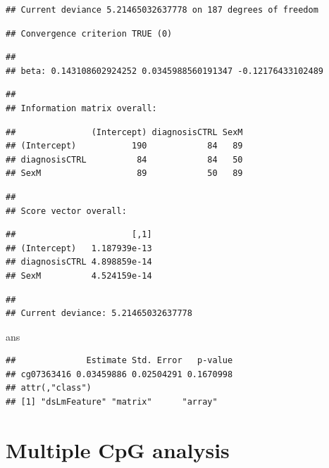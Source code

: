 \documentclass[
]{book}
\newenvironment{Shaded}{\begin{snugshade}}{\end{snugshade}}
\newcommand{\NormalTok}[1]{#1}
\begin{document}
\begin{verbatim}
## Current deviance 5.21465032637778 on 187 degrees of freedom
\end{verbatim}

\begin{verbatim}
## Convergence criterion TRUE (0)
\end{verbatim}

\begin{verbatim}
## 
## beta: 0.143108602924252 0.0345988560191347 -0.12176433102489
\end{verbatim}

\begin{verbatim}
## 
## Information matrix overall:
\end{verbatim}

\begin{verbatim}
##               (Intercept) diagnosisCTRL SexM
## (Intercept)           190            84   89
## diagnosisCTRL          84            84   50
## SexM                   89            50   89
\end{verbatim}

\begin{verbatim}
## 
## Score vector overall:
\end{verbatim}

\begin{verbatim}
##                       [,1]
## (Intercept)   1.187939e-13
## diagnosisCTRL 4.898859e-14
## SexM          4.524159e-14
\end{verbatim}

\begin{verbatim}
## 
## Current deviance: 5.21465032637778
\end{verbatim}

\begin{Shaded}
\begin{Highlighting}[]
\NormalTok{ans}
\end{Highlighting}
\end{Shaded}

\begin{verbatim}
##              Estimate Std. Error   p-value
## cg07363416 0.03459886 0.02504291 0.1670998
## attr(,"class")
## [1] "dsLmFeature" "matrix"      "array"
\end{verbatim}

\hypertarget{multiple-cpg-analysis}{%
\section{Multiple CpG analysis}\label{multiple-cpg-analysis}}
\end{document}
